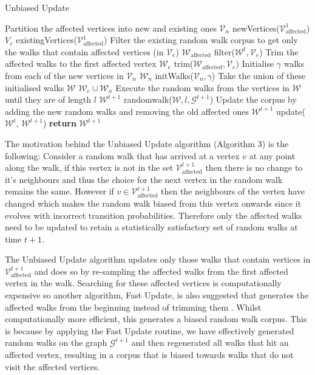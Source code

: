 \documentclass[a4paper]{article}
\renewcommand{\G}{\mathcal G}
\renewcommand{\V}{\mathcal V}
\newcommand{\W}{\mathcal W}
\begin{document}
\begin{algorithm}[!ht]
  \caption{Unbiased Update}
  \begin{algorithmic}[1]

    \Procedure{UnbiasedUpdate}{$\G^{t+1}, \W^t, \V^1_{\text{affected}}, \gamma, l$}
    \LineComment Partition the affected vertices into new and existing ones
    \State $\V_n$ \leftarrow newVertices($\V_{\text{affected}}^1$)
    \State $V_e$ \leftarrow existingVertices($\V_{\text{affected}}^1$)
    \LineComment Filter the existing random walk corpus to get only the walks
    that contain affected vertices (in $\V_e$)
    \State $\W_{\text{affected}}$ \leftarrow filter($\W^t, \V_e$)
    \LineComment Trim the affected walks to the first affected vertex
    \State $\W_e$ \leftarrow trim($\W_{\text{affected}}, \V_e$)
    \LineComment Initialise $\gamma$ walks from each of the new vertices in $\V_n$
    \State $\W_n$ \leftarrow initWalks($\V_n, \gamma$)
    \LineComment Take the union of these initialised walks
    \State $\W$ \leftarrow $\W_e \cup \W_n$
    \LineComment Execute the random walks from the vertices in $\W$ until they are of length $l$
    \State $\W^{t+1}$ \leftarrow randomwalk($\W, l, \G^{t+1}$)
    \LineComment Update the corpus by adding the new random walks and removing the old affected ones
    \State $\W^{t+1}$ \leftarrow update($\W^t$, $\W^{t+1}$)
    \State \textbf{return} $\W^{t+1}$
    \EndProcedure
  \end{algorithmic}
\end{algorithm}
The motivation behind the Unbiased Update algorithm (Algorithm 3) is the following: Consider a
random walk that has arrived at a vertex $v$ at any point along the walk, if
this vertex is not in the set $\V^{t+1}_{\text{affected}}$ then there is no
change to it's neighbours and thus the choice for the next vertex in the random
walk remains the same. However if $v \in \V^{t+1}_{\text{affected}}$ then the
neighbours of the vertex have changed which makes the random walk biased from
this vertex onwards since it evolves with incorrect transition probabilities. Therefore only the affected walks need to be updated to retain a statistically
satisfactory set of random walks at time $t+1$.

The Unbiased Update algorithm updates only those walks that contain vertices in
$\V^{t+1}_{\text{affected}}$ and does so by re-sampling the affected walks from
the first affected vertex in the walk. Searching for these affected vertices is computationally expensive so another algorithm,
Fast Update, is also suggested that generates the affected walks from the
beginning instead of trimming them \cite{sajjad2019}. Whilst computationally more efficient, this
generates a biased random walk corpus. This is because by applying the Fast Update routine, we have
effectively generated random walks on the graph $\G^{t+1}$ and then regenerated
all walks that hit an affected vertex, resulting in a corpus that is biased towards walks
that do not visit the affected vertices.
\end{document}
